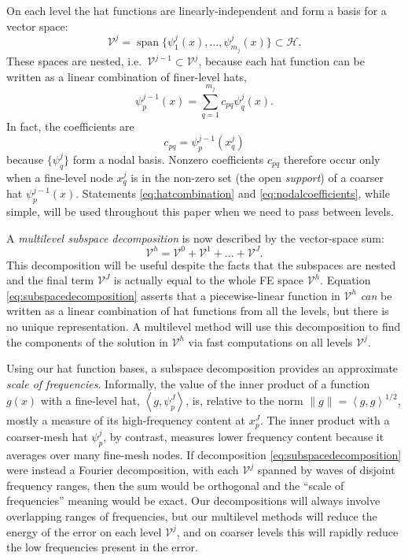 \documentclass[letterpaper,final,12pt,reqno]{amsart}
\theoremstyle{claim}
\newcommand{\ip}[2]{\left<#1,#2\right>}
\numberwithin{equation}{section}
\numberwithin{figure}{section}
\numberwithin{table}{section}
\numberwithin{theorem}{section}
\begin{document}
On each level the hat functions are linearly-independent and form a basis for a vector space:
\begin{equation}
  \mathcal{V}^j = \operatorname{span}\{\psi_1^j(x),\dots,\psi_{m_j}^j(x)\} \subset \mathcal{H}.  \label{eq:definevk}
\end{equation}
These spaces are nested, i.e.~$\mathcal{V}^{j-1} \subset \mathcal{V}^j$, because each hat function can be written as a linear combination of finer-level hats,
\begin{equation}
   \psi_p^{j-1}(x) = \sum_{q=1}^{m_j} c_{pq} \psi_q^j(x). \label{eq:hatcombination}
\end{equation}
In fact, the coefficients are
\begin{equation}
  c_{pq} = \psi_p^{j-1}(x_q^j) \label{eq:nodalcoefficients}
\end{equation}
because $\{\psi_q^j\}$ form a nodal basis.  Nonzero coefficients $c_{pq}$ therefore occur only when a fine-level node $x_q^j$ is in the non-zero set (the open \emph{support}) of a coarser hat $\psi_p^{j-1}(x)$.  Statements \eqref{eq:hatcombination} and \eqref{eq:nodalcoefficients}, while simple, will be used throughout this paper when we need to pass between levels.

A \emph{multilevel subspace decomposition} is now described by the vector-space sum:
\begin{equation}
  \mathcal{V}^h = \mathcal{V}^0 + \mathcal{V}^1 + \dots + \mathcal{V}^J. \label{eq:subspacedecomposition}
\end{equation}
This decomposition will be useful despite the facts that the subspaces are nested and the final term $\mathcal{V}^J$ is actually equal to the whole FE space $\mathcal{V}^h$.  Equation \eqref{eq:subspacedecomposition} asserts that a piecewise-linear function in $\mathcal{V}^h$ \emph{can} be written as a linear combination of hat functions from all the levels, but there is no unique representation.  A multilevel method will use this decomposition to find the components of the solution in $\mathcal{V}^h$ via fast computations on all levels $\mathcal{V}^j$.

Using our hat function bases, a subspace decomposition provides an approximate \emph{scale of frequencies}.  Informally, the value of the inner product of a function $g(x)$ with a fine-level hat, $\ip{g}{\psi_p^J}$, is, relative to the norm $\|g\| = \ip{g}{g}^{1/2}$, mostly a measure of its high-frequency content at $x_p^J$.  The inner product with a coarser-mesh hat $\psi_p^j$, by contrast, measures lower frequency content because it averages over many fine-mesh nodes.  If decomposition \eqref{eq:subspacedecomposition} were instead a Fourier decomposition, with each $\mathcal{V}^j$ spanned by waves of disjoint frequency ranges, then the sum would be orthogonal and the ``scale of frequencies'' meaning would be exact.  Our decompositions will always involve overlapping ranges of frequencies, but our multilevel methods will reduce the energy of the error on each level $\mathcal{V}^j$, and on coarser levels this will rapidly reduce the low frequencies present in the error.
\end{document}
